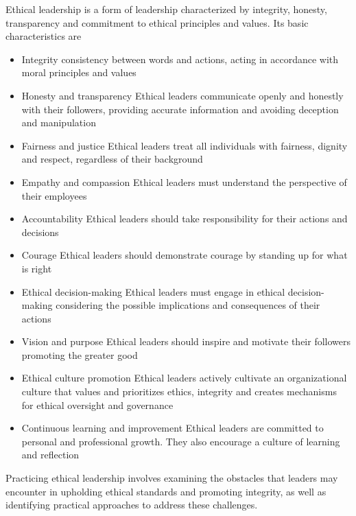 Ethical leadership is a form of leadership characterized by integrity, honesty, transparency and commitment to ethical principles and values. Its basic characteristics are
\begin{itemize}
    \item Integrity \ra consistency between words and actions, acting in accordance with moral principles and values
    \item Honesty and transparency \ra Ethical leaders communicate openly and honestly with their followers, providing accurate information and avoiding deception and manipulation
    \item Fairness and justice \ra Ethical leaders treat all individuals with fairness, dignity and respect, regardless of their background
    \item Empathy and compassion \ra Ethical leaders must understand the perspective of their employees
    \item Accountability \ra Ethical leaders should take responsibility for their actions and decisions
    \item Courage \ra Ethical leaders should demonstrate courage by standing up for what is right
    \item Ethical decision-making \ra Ethical leaders must engage in ethical decision-making considering the possible implications and consequences of their actions
    \item Vision and purpose \ra Ethical leaders should inspire and motivate their followers promoting the greater good
    \item Ethical culture promotion \ra Ethical leaders actively cultivate an organizational culture that values and prioritizes ethics, integrity and creates mechanisms for ethical oversight and governance
    \item Continuous learning and improvement \ra Ethical leaders are committed to personal and professional growth. They also encourage a culture of learning and reflection
\end{itemize}

Practicing ethical leadership involves examining the obstacles that leaders may encounter in upholding ethical standards and promoting integrity, as well as identifying practical approaches to address these challenges.

\vspace{10pt}

